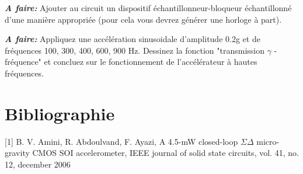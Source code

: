 \documentclass[12pt,A4,onecolumn,french]{article}
\begin{document}
\emph{\bf A faire:} Ajouter au circuit un dispositif échantillonneur-bloqueur
échantillonné d'une manière appropriée (pour cela vous devrez générer une horloge à part).

\emph{\bf A faire:} Appliquez une accélération sinusoidale d'amplitude 0.2g et de fréquences 100, 300, 400, 600, 900 Hz. Dessinez la fonction "transmission $\gamma$ - fréquence" et concluez sur le fonctionnement de l'accélérateur à hautes fréquences.  

\section{Bibliographie}
[1] B. V. Amini, R. Abdoulvand, F. Ayazi, A 4.5-mW closed-loop $\Sigma\Delta$ micro-gravity CMOS SOI accelerometer, IEEE journal of solid state circuits, vol. 41, no. 12, december 2006
\end{document}

